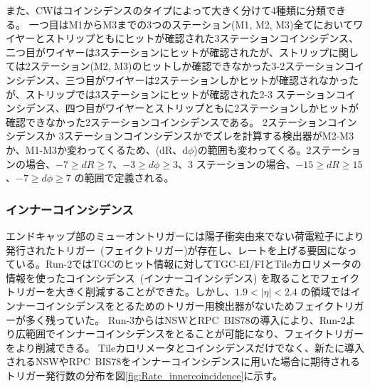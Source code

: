 また、CWはコインシデンスのタイプによって大きく分けて4種類に分類できる。
一つ目はM1からM3までの3つのステーション(M1, M2, M3)全てにおいてワイヤーとストリップともにヒットが確認された3ステーションコインシデンス、二つ目がワイヤーは3ステーションにヒットが確認されたが、ストリップに関しては2ステーション(M2, M3)のヒットしか確認できなかった3-2ステーションコインシデンス、三つ目がワイヤーは2ステーションしかヒットが確認されなかったが、ストリップでは3ステーションにヒットが確認された2-3 ステーションコインシデンス、四つ目がワイヤーとストリップともに2ステーションしかヒットが確認できなかった2ステーションコインシデンスである。
2ステーションコインシデンスか 3ステーションコインシデンスかでズレを計算する検出器がM2-M3か、M1-M3か変わってくるため、(dR、d$\phi$)の範囲も変わってくる。2ステーションの場合、$−7 \geq dR \geq 7$、$−3 \geq d\phi \geq 3$、3 ステーションの場合、$−15 \geq dR \geq 15$、$−7 \geq d\phi \geq 7$ の範囲で定義される。

\subsubsection{インナーコインシデンス}\label{innnercoin}
エンドキャップ部のミューオントリガーには陽子衝突由来でない荷電粒子により発行されたトリガー~(フェイクトリガー)が存在し、レートを上げる要因になっている。Run-2ではTGCのヒット情報に対してTGC-EI/FIとTileカロリメータの情報を使ったコインシデンス~(インナーコインシデンス) を取ることでフェイクトリガーを大きく削減することができた。しかし、$1.9 < |\eta| < 2.4$ の領域ではインナーコインシデンスをとるためのトリガー用検出器がないためフェイクトリガーが多く残っていた。
Run-3からはNSWとRPC~BIS78の導入により、Run-2より広範囲でインナーコインシデンスをとることが可能になり、フェイクトリガーをより削減できる。
Tileカロリメータとコインシデンスだけでなく、新たに導入されるNSWやRPC~BIS78をインナーコインシデンスに用いた場合に期待されるトリガー発行数の分布を図\ref{fig:Rate_innercoincidence}に示す。

